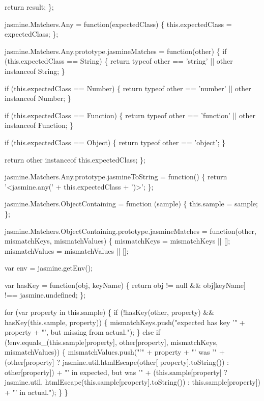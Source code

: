 \begin{DoxyCodeInclude}
  \textcolor{keywordflow}{return} result;
\};

jasmine.Matchers.Any = \textcolor{keyword}{function}(expectedClass) \{
  this.expectedClass = expectedClass;
\};

jasmine.Matchers.Any.prototype.jasmineMatches = \textcolor{keyword}{function}(other) \{
  \textcolor{keywordflow}{if} (this.expectedClass == String) \{
    \textcolor{keywordflow}{return} typeof other == \textcolor{stringliteral}{'string'} || other instanceof String;
  \}

  \textcolor{keywordflow}{if} (this.expectedClass == Number) \{
    \textcolor{keywordflow}{return} typeof other == \textcolor{stringliteral}{'number'} || other instanceof Number;
  \}

  \textcolor{keywordflow}{if} (this.expectedClass == Function) \{
    \textcolor{keywordflow}{return} typeof other == \textcolor{stringliteral}{'function'} || other instanceof Function;
  \}

  \textcolor{keywordflow}{if} (this.expectedClass == Object) \{
    \textcolor{keywordflow}{return} typeof other == \textcolor{stringliteral}{'object'};
  \}

  \textcolor{keywordflow}{return} other instanceof this.expectedClass;
\};

jasmine.Matchers.Any.prototype.jasmineToString = \textcolor{keyword}{function}() \{
  \textcolor{keywordflow}{return} \textcolor{stringliteral}{'<jasmine.any('} + this.expectedClass + \textcolor{stringliteral}{')>'};
\};

jasmine.Matchers.ObjectContaining = \textcolor{keyword}{function} (sample) \{
  this.sample = sample;
\};

jasmine.Matchers.ObjectContaining.prototype.jasmineMatches = \textcolor{keyword}{function}(other, mismatchKeys, mismatchValues) 
      \{
  mismatchKeys = mismatchKeys || [];
  mismatchValues = mismatchValues || [];

  var env = jasmine.getEnv();

  var hasKey = \textcolor{keyword}{function}(obj, keyName) \{
    \textcolor{keywordflow}{return} obj != null && obj[keyName] !== jasmine.undefined;
  \};

  \textcolor{keywordflow}{for} (var property in this.sample) \{
    \textcolor{keywordflow}{if} (!hasKey(other, property) && hasKey(this.sample, property)) \{
      mismatchKeys.push(\textcolor{stringliteral}{"expected has key '"} + property + \textcolor{stringliteral}{"', but missing from actual."});
    \}
    \textcolor{keywordflow}{else} \textcolor{keywordflow}{if} (!env.equals\_(\textcolor{keyword}{this}.sample[property], other[property], mismatchKeys, mismatchValues)) \{
      mismatchValues.push(\textcolor{stringliteral}{"'"} + property + \textcolor{stringliteral}{"' was '"} + (other[property] ? jasmine.util.htmlEscape(other[
      property].toString()) : other[property]) + \textcolor{stringliteral}{"' in expected, but was '"} + (this.sample[property] ? jasmine.util.
      htmlEscape(this.sample[property].toString()) : this.sample[property]) + \textcolor{stringliteral}{"' in actual."});
    \}
  \}


\end{DoxyCodeInclude}
